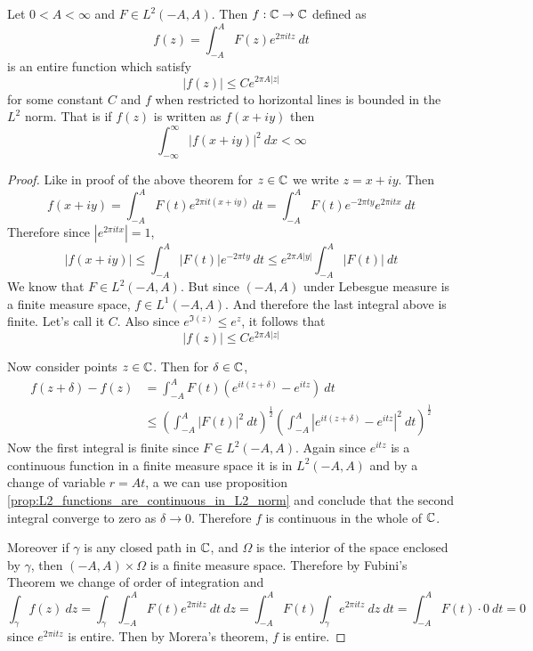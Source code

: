 \begin{proposition}
  Let $0<A<\infty$ and $F \in L^2(-A, A)$. Then $f:\mathbb C \to \mathbb C$ defined as $$f(z) = \int_{-A}^A F(z)e^{2\pi itz} \ dt$$
  is an entire function which satisfy $$|f(z)| \le Ce^{2 \pi A|z|}$$
  for some constant $C$ and $f$ when restricted to horizontal lines is bounded in the $L^2$ norm. That is if $f(z)$ is written as $f(x+iy)$ then  $$\int_{-\infty}^{\infty} |f(x+iy)|^2 \ dx < \infty$$
\end{proposition}
\begin{proof}
  Like in proof of the above theorem for $z\in \mathbb C$ we write $z = x+iy$. Then $$f(x+iy) = \int_{-A}^A F(t) e^{2\pi it(x+iy)} \ dt = \int_{-A}^A F(t)e^{-2\pi ty}e^{2\pi itx} \ dt$$
  Therefore since $|e^{2\pi it x}| = 1$, $$\left|f(x+iy)\right| \le \int_{-A}^A \left|F(t)\right| e^{-2\pi ty} \ dt \le e^{2\pi A|y|} \int_{-A}^A \left|F(t)\right| \ dt $$
  We know that $F \in L^2(-A, A)$. But since $(-A, A)$ under Lebesgue measure is a finite measure space, $f \in L^1(-A, A)$. And therefore the last integral above is finite. Let's call it $C$. Also since $e^{\Im(z)} \le e^z$, it follows that $$\left|f(z) \right| \le Ce^{2\pi A |z|}$$

  Now consider points $z \in \mathbb C$. Then for $\delta \in \mathbb C$,
  \begin{align*}
    f(z+\delta) - f(z) &= \int_{-A}^A F(t)\left(e^{it(z+\delta)} - e^{itz}\right) \ dt \\
    &\le \left(\int_{-A}^A \left|F(t)\right|^2\ dt \right)^{\frac{1}{2}} \left(\int_{-A}^A \left|e^{it(z+\delta)}-e^{itz}\right|^2 \ dt \right)^{\frac{1}{2}}
  \end{align*}
  Now the first integral is finite since $F\in L^2(-A, A)$. Again since $e^{itz}$ is a continuous function in a finite measure space it is in $L^2(-A, A)$ and by a change of variable $r = At$, a we can use proposition \ref{prop:L2_functions_are_continuous_in_L2_norm} and conclude that the second integral converge to zero as $\delta \to 0$. Therefore $f$ is continuous in the whole of $\mathbb C$. 

  Moreover if $\gamma$ is any closed path in $\mathbb C$, and $\Omega$ is the interior of the space enclosed by $\gamma$, then $(-A, A)\times\Omega$ is a finite measure space. Therefore by Fubini's Theorem we change of order of integration and $$\int_\gamma f(z) \ dz = \int_\gamma \int_{-A}^A F(t)e^{2\pi itz} \ dt \ dz = \int_{-A}^A F(t) \int_\gamma e^{2\pi itz} \ dz \ dt = \int_{-A}^A F(t)\cdot 0 \ dt = 0$$
  since $e^{2\pi itz}$ is entire. Then by Morera's theorem, $f$ is entire.


\end{proof}
